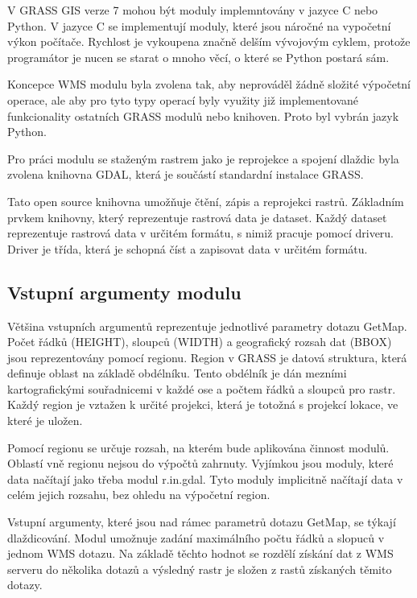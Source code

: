 \documentclass[a4paper,12pt]{article}
\begin{document}
V GRASS GIS verze 7 mohou být moduly implemntovány v jazyce C nebo Python. V jazyce C se implementují moduly, které jsou náročné na vypočetní výkon počítače. 
Rychlost je vykoupena značně delším vývojovým cyklem, protože programátor je nucen se starat o mnoho věcí, o které se Python postará sám.

Koncepce WMS modulu byla zvolena tak, aby neprováděl žádně složité výpočetní operace, ale aby pro tyto typy operací byly využity již implementované funkcionality 
ostatních GRASS modulů nebo knihoven. Proto byl vybrán jazyk Python. 

Pro práci modulu se staženým rastrem jako je reprojekce a spojení dlaždic byla zvolena knihovna GDAL, která je součástí standardní instalace GRASS.

Tato open source knihovna umožňuje čtění, zápis a reprojekci rastrů.  
Základním prvkem knihovny, který reprezentuje rastrová data je dataset.  Každý dataset reprezentuje rastrová data v určitém formátu, s nimiž pracuje pomocí driveru. Driver je třída, která je schopná číst a zapisovat data v určitém formátu. 

\subsection{Vstupní argumenty modulu}


Většina vstupních argumentů reprezentuje jednotlivé parametry dotazu GetMap. Počet řádků (HEIGHT), sloupců (WIDTH) a geografický rozsah dat (BBOX) 
jsou reprezentovány pomocí regionu. Region v GRASS je datová struktura, která definuje oblast na základě obdélníku. Tento obdélník je dán mezními kartografickými  souřadnicemi v každé ose a počtem řádků a sloupců pro rastr. Každý region je vztažen k určité projekci, která je totožná s projekcí lokace, ve které je uložen.

Pomocí regionu se určuje rozsah, na kterém bude aplikována činnost modulů.
Oblastí vně regionu nejsou do výpočtů zahrnuty. Vyjímkou jsou moduly, které data načítají jako třeba modul r.in.gdal. Tyto moduly implicitně načítají data v celém jejich rozsahu, bez ohledu na výpočetní region. 

Vstupní argumenty, které jsou nad rámec parametrů dotazu GetMap, se týkají dlaždicování. Modul umožnuje zadání maximálního počtu řádků 
a slopuců v jednom WMS dotazu. Na základě těchto hodnot se rozdělí získání dat z WMS serveru do několika dotazů a výsledný rastr je složen z rastů získaných těmito dotazy. 
   
\end{document}
